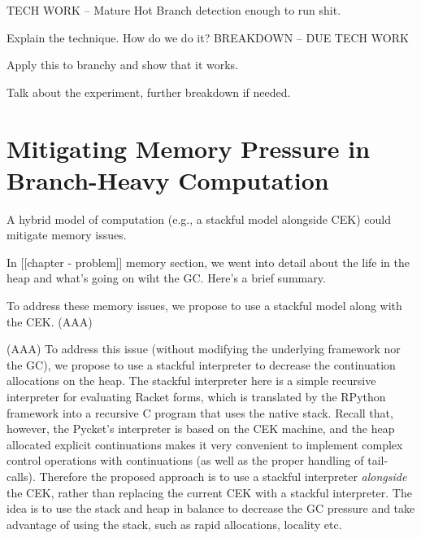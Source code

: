     \begin{todo}
      TECH WORK -- Mature Hot Branch detection enough to run shit.
    \end{todo}

    \begin{paragraph-here}
      Explain the technique.
      How do we do it? BREAKDOWN -- DUE TECH WORK
    \end{paragraph-here}

    \begin{show-experiment}
      Apply this to branchy and show that it works.
    \end{show-experiment}

    \begin{paragraph-here}
      Talk about the experiment, further breakdown if needed.
    \end{paragraph-here}

	\section{Mitigating Memory Pressure in Branch-Heavy Computation}
		\begin{mainpoint}
			A hybrid model of computation (e.g., a stackful model alongside CEK) could mitigate memory issues.
		\end{mainpoint}

    \begin{paragraph-here}
       In [[chapter - problem]] memory section, we went into detail about the life in the heap and what's going on wiht the GC. Here's a brief summary.
    \end{paragraph-here}

    \begin{paragraph-here}
      To address these memory issues, we propose to use a stackful model along with the CEK. (AAA)
    \end{paragraph-here}

    (AAA) To address this issue (without modifying the underlying framework nor
    the GC), we propose to use a stackful interpreter to decrease the continuation allocations on the heap. The stackful interpreter here is
    a simple recursive interpreter for evaluating Racket forms, which is
    translated by the RPython framework into a recursive C program that
    uses the native stack. Recall that, however, the Pycket's interpreter
    is based on the CEK machine, and the heap allocated explicit
    continuations makes it very convenient to implement complex control
    operations with continuations (as well as the proper handling of
    tail-calls). Therefore the proposed approach is to use a stackful
    interpreter \emph{alongside} the CEK, rather than replacing the
    current CEK with a stackful interpreter. The idea is to use the stack
    and heap in balance to decrease the GC pressure and take advantage of
    using the stack, such as rapid allocations, locality etc.


